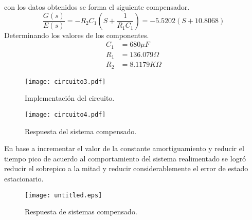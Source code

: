 \documentclass[10pt, a4paper]{report}
\begin{document}
   con los datos obtenidos se forma el siguiente compensador.
   \begin{equation*}
     \frac{G(s)}{E(s)} = - R_2 C_1 (S+\frac{1}{R_1 C_1}) =- 5.5202(S+ 10.8068)
   \end{equation*}
   Determinando los valores de los componentes.
   \begin{equation*}
     \begin{split}
       C_1&=680 \mu F\\
       R_1&=136.079 \Omega\\
       R_2&= 8.1179 K \Omega 
     \end{split}
   \end{equation*}
   \begin{figure}[htp]
    \centering
    \texttt{[image: circuito3.pdf]}
    \caption{Implementación del circuito.}
   
  \end{figure}


  \begin{figure}[htp]
    \centering
    \texttt{[image: circuito4.pdf]}
    \caption{Respuesta del sistema compensado.}
  
  \end{figure}

  En base a incrementar el valor de la constante amortiguamiento y reducir el tiempo pico de acuerdo al comportamiento del sistema realimentado se logró reducir el sobrepico a la mitad y reducir considerablemente el error de estado estacionario.
  
  \begin{figure}[htp]
    \centering
    \texttt{[image: untitled.eps]}
    \caption{Respuesta de sistemas compensado.}
    \label{fig:espfig2}
  \end{figure}
  
\end{document}
